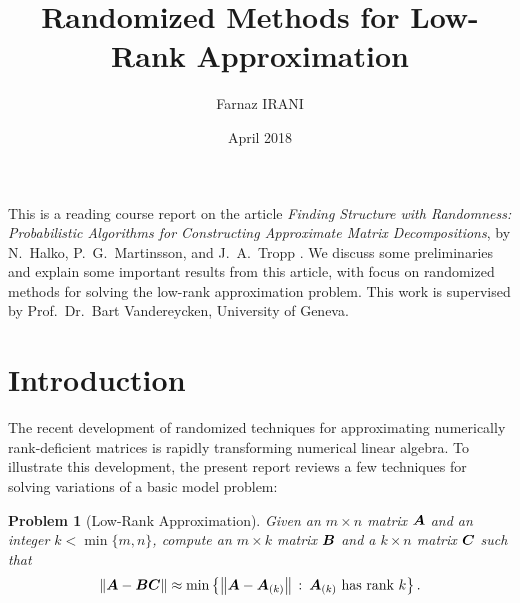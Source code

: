 \documentclass[12pt]{article}
\title{\textbf{Randomized Methods for Low-Rank Approximation}}
\author{Farnaz IRANI}
\date{April 2018}
\newtheorem{defn}{Problem}
\begin{document}
\maketitle

This is a reading course report on the article \textit{Finding Structure with Randomness: Probabilistic Algorithms for Constructing Approximate Matrix Decompositions}, by N.~Halko, P.~G.~Martinsson, and J.~A.~Tropp \cite{RM}.
We discuss some preliminaries and explain some important results from this article, with focus on randomized methods for solving the low-rank approximation problem. This work is supervised by Prof.~Dr.~Bart Vandereycken, University of Geneva.

\section{Introduction}
The recent development of randomized techniques for approximating numerically rank-deficient matrices is rapidly transforming numerical linear algebra. To illustrate this development, the present report reviews a few techniques \cite{RM} for solving variations of a basic model problem: 
\begin{defn}[Low-Rank Approximation]
\label{problem:low-rank}
Given an $m\times n$ matrix $\bm{A}$ and an integer $k < \min\{m,n\}$, compute an $m\times k$ matrix $\bm{B}$ and a $k\times n$ matrix $\bm{C}$ such that 
\[
\left\Vert {\bm{A} - \bm{B}\bm{C}} \right\Vert \approx \min\left\{\left\Vert {\bm{A} - \bm{A}_{(k)}} \right\Vert\,\colon\, \bm{A}_{(k)}\mbox{ has rank }k\right\}.
\]
\end{defn}

\end{document}
